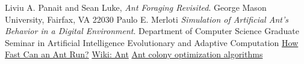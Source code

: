 \documentclass[paper=a4, fontsize=11pt]{scrartcl} %
\numberwithin{equation}{section} %
\numberwithin{figure}{section} %
\numberwithin{table}{section} %
\begin{document}
\newpage
\begin{thebibliography}{9}

  Liviu A. Panait and Sean Luke,
  \emph{Ant Foraging Revisited}.
  George Mason University, Fairfax, VA 22030
Paulo E. Merloti 
\emph{Simulation of Artificial Ant's Behavior 
in a Digital Environment}.
Department of Computer Science 
Graduate Seminar in Artificial Intelligence 
Evolutionary and Adaptive Computation
\href{http://www.ehow.com/about_5365350_fast-can-ant-run.html}{How Fast Can an Ant Run?}
\href{http://en.wikipedia.org/wiki/Ant}{Wiki: Ant}
\href{http://en.wikipedia.org/wiki/Ant_colony_optimization_algorithms}{Ant colony optimization algorithms}
  

  \end{thebibliography}
\end{document}
